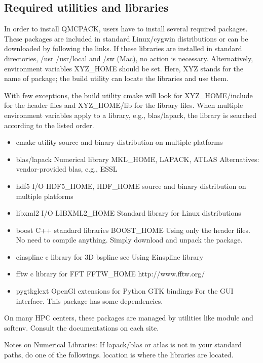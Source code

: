 \subsection{Required utilities and libraries}
In order to install QMCPACK, users have to install several required packages. These packages are included in standard Linux/cygwin distributions or can be downloaded by following the links. If these libraries are installed in standard directories, /usr /usr/local and /sw (Mac), no action is necessary. Alternatively, environment variables XYZ\_HOME should be set. Here, XYZ stands for the name of package; the build utility can locate the libraries and use them.

With few exceptions, the build utility cmake will look for XYZ\_HOME/include for the header files and XYZ\_HOME/lib for the library files. When multiple environment variables apply to a library, e.g., blas/lapack, the library is searched according to the listed order. 
\begin{itemize}
\item{} cmake   utility                 source and binary distribution on multiple platforms
\item{} blas/lapack     Numerical library       MKL\_HOME, LAPACK, ATLAS         Alternatives: vendor-provided blas, e.g., ESSL
\item{} hdf5    I/O     HDF5\_HOME, HDF\_HOME     source and binary distribution on multiple platforms
\item{} libxml2         I/O     LIBXML2\_HOME    Standard library for Linux distributions
\item{} boost   C++ standard libraries  BOOST\_HOME      Using only the header files. No need to compile anything. Simply download and unpack the package.
\item{} einspline       c library for 3D bspline        see Using Einspline library     
\item{} fftw    c library for FFT       FFTW\_HOME       http://www.fftw.org/
\item{} pygtkglext      OpenGl extensions for Python GTK bindings               For the GUI interface. This package has some dependencies.
\end{itemize}

On many HPC centers, these packages are managed by utilities like module and softenv. Consult the documentations on each site.

Notes on Numerical Libraries: If lapack/blas or atlas is not in your standard paths, do one of the followings. location is where the libraries are located.

